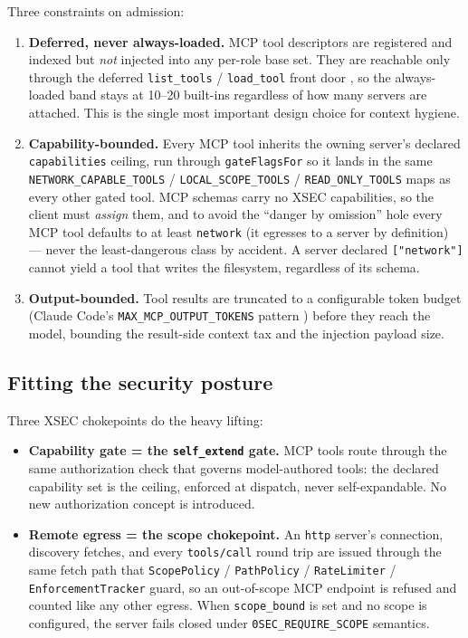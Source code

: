 \documentclass[11pt]{article}
\begin{document}
Three constraints on admission:
\begin{enumerate}[leftmargin=*]
  \item \textbf{Deferred, never always-loaded.} MCP tool descriptors are
  registered and indexed but \emph{not} injected into any per-role base set. They
  are reachable only through the deferred \texttt{list\_tools} /
  \texttt{load\_tool} front door \cite{tool-curation}, so the always-loaded band
  stays at 10--20 built-ins regardless of how many servers are attached. This is
  the single most important design choice for context hygiene.
  \item \textbf{Capability-bounded.} Every MCP tool inherits the owning server's
  declared \texttt{capabilities} ceiling, run through \texttt{gateFlagsFor} so it
  lands in the same \texttt{NETWORK\_CAPABLE\_TOOLS} / \texttt{LOCAL\_SCOPE\_TOOLS}
  / \texttt{READ\_ONLY\_TOOLS} maps as every other gated tool. MCP schemas carry
  no XSEC capabilities, so the client must \emph{assign} them, and to avoid the
  ``danger by omission'' hole every MCP tool defaults to at least
  \texttt{network} (it egresses to a server by definition) --- never the
  least-dangerous class by accident. A server declared \texttt{["network"]}
  cannot yield a tool that writes the filesystem, regardless of its schema.
  \item \textbf{Output-bounded.} Tool results are truncated to a configurable
  token budget (Claude Code's \texttt{MAX\_MCP\_OUTPUT\_TOKENS} pattern
  \cite{claudecode-mcp}) before they reach the model, bounding the result-side
  context tax and the injection payload size.
\end{enumerate}

\subsection{Fitting the security posture}

Three XSEC chokepoints do the heavy lifting:

\begin{itemize}[leftmargin=*]
  \item \textbf{Capability gate = the \texttt{self\_extend} gate.} MCP tools
  route through the same authorization check that governs model-authored tools:
  the declared capability set is the ceiling, enforced at dispatch, never
  self-expandable. No new authorization concept is introduced.
  \item \textbf{Remote egress = the scope chokepoint.} An \texttt{http} server's
  connection, discovery fetches, and every \texttt{tools/call} round trip are
  issued through the same fetch path that \texttt{ScopePolicy} /
  \texttt{PathPolicy} / \texttt{RateLimiter} / \texttt{EnforcementTracker} guard,
  so an out-of-scope MCP endpoint is refused and counted like any other egress.
  When \texttt{scope\_bound} is set and no scope is configured, the server fails
  closed under \texttt{0SEC\_REQUIRE\_SCOPE} semantics.
\end{itemize}
\end{document}
